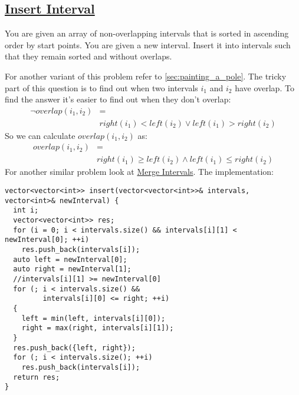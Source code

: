 \documentclass{book}
\begin{document}
	\subsection{\href{https://leetcode.com/problems/insert-interval/}{Insert Interval}}
	\label{subsec:insert_interval}
	You are given an array of non-overlapping intervals that is sorted in ascending order by start points. You are given a new interval. Insert it into intervals such that they remain sorted and without overlaps.
	\par For another variant of this problem refer to \ref{sec:painting_a_pole}. The tricky part of this question is to find out when two intervals $i_1$ and $i_2$ have overlap. To find the answer it's easier to find out when they don't overlap:
	\begin{equation*}
		\begin{split}
			\neg overlap(i_1, i_2) &= \\
			& right(i_1) < left(i_2) \lor left(i_1) > right(i_2)
		\end{split}
	\end{equation*}
	So we can calculate $overlap(i_1, i_2)$ as:
	\begin{equation*}
	\begin{split}
		overlap(i_1, i_2) &= \\
		& right(i_1) \ge left(i_2) \land left(i_1) \le right(i_2)
	\end{split}
\end{equation*}	
	For another similar problem look at \href{https://leetcode.com/problems/merge-intervals/}{Merge Intervals}. The implementation:
	\begin{lstlisting}
vector<vector<int>> insert(vector<vector<int>>& intervals, vector<int>& newInterval) {
  int i;
  vector<vector<int>> res;
  for (i = 0; i < intervals.size() && intervals[i][1] < newInterval[0]; ++i)
    res.push_back(intervals[i]);
  auto left = newInterval[0];
  auto right = newInterval[1];
  //intervals[i][1] >= newInterval[0]
  for (; i < intervals.size() &&
         intervals[i][0] <= right; ++i)
  {
    left = min(left, intervals[i][0]);
    right = max(right, intervals[i][1]);
  }
  res.push_back({left, right});
  for (; i < intervals.size(); ++i)
    res.push_back(intervals[i]);
  return res;
}
	\end{lstlisting}
\end{document}
